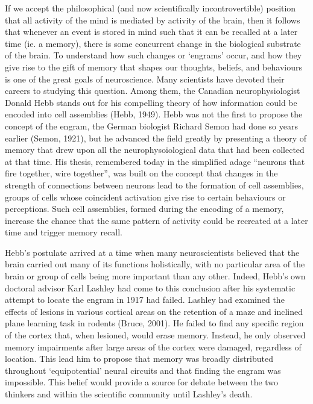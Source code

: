 \documentclass[12pt,a4paper,]{report}
\begin{document}
If we accept the philosophical (and now scientifically incontrovertible)
position that all activity of the mind is mediated by activity of the
brain, then it follows that whenever an event is stored in mind such
that it can be recalled at a later time (ie. a memory), there is some
concurrent change in the biological substrate of the brain. To
understand how such changes or `engrams' occur, and how they give rise
to the gift of memory that shapes our thoughts, beliefs, and behaviours
is one of the great goals of neuroscience. Many scientists have devoted
their careers to studying this question. Among them, the Canadian
neurophysiologist Donald Hebb stands out for his compelling theory of
how information could be encoded into cell assemblies (Hebb, 1949). Hebb
was not the first to propose the concept of the engram, the German
biologist Richard Semon had done so years earlier (Semon, 1921), but he
advanced the field greatly by presenting a theory of memory that drew
upon all the neurophysoiological data that had been collected at that
time. His thesis, remembered today in the simplified adage ``neurons
that fire together, wire together'', was built on the concept that
changes in the strength of connections between neurons lead to the
formation of cell assemblies, groups of cells whose coincident
activation give rise to certain behaviours or perceptions. Such cell
assemblies, formed during the encoding of a memory, increase the chance
that the same pattern of activity could be recreated at a later time and
trigger memory recall.

Hebb's postulate arrived at a time when many neuroscientists believed
that the brain carried out many of its functions holistically, with no
particular area of the brain or group of cells being more important than
any other. Indeed, Hebb's own doctoral advisor Karl Lashley had come to
this conclusion after his systematic attempt to locate the engram in
1917 had failed. Lashley had examined the effects of lesions in various
cortical areas on the retention of a maze and inclined plane learning
task in rodents (Bruce, 2001). He failed to find any specific region of
the cortex that, when lesioned, would erase memory. Instead, he only
observed memory impairments after large areas of the cortex were
damaged, regardless of location. This lead him to propose that memory
was broadly distributed throughout `equipotential' neural circuits and
that finding the engram was impossible. This belief would provide a
source for debate between the two thinkers and within the scientific
community until Lashley's death.
\end{document}
